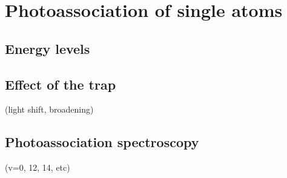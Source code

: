 
\chapter{Photoassociation of single atoms}

\section{Energy levels}

\section{Effect of the trap}

(light shift, broadening)

\section{Photoassociation spectroscopy}
(v=0, 12, 14, etc)
